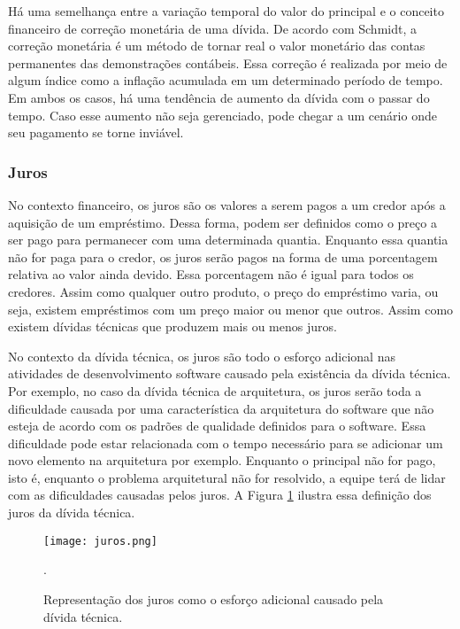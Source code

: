 Há uma semelhança entre a variação temporal do valor do principal e o conceito financeiro de correção monetária de uma dívida. De acordo com Schmidt\cite{santos2007teoria}, a correção monetária é um método de tornar real o valor monetário das contas permanentes das demonstrações contábeis. Essa correção é realizada por meio de algum índice como a inflação acumulada em um determinado período de tempo. Em ambos os casos, há uma tendência de aumento da dívida com o passar do tempo. Caso esse aumento não seja gerenciado, pode chegar a um cenário onde seu pagamento se torne inviável. 

\subsubsection{Juros} 

No contexto financeiro, os juros são os valores a serem pagos a um credor após a aquisição de um empréstimo. Dessa forma, podem ser definidos como o preço a ser pago para permanecer com uma determinada quantia. Enquanto essa quantia não for paga para o credor, os juros serão pagos na forma de uma porcentagem relativa ao valor ainda devido. Essa porcentagem não é igual para todos os credores. Assim como qualquer outro produto, o preço do empréstimo varia, ou seja, existem empréstimos com um preço maior ou menor que outros. Assim como existem dívidas técnicas que produzem mais ou menos juros.

No contexto da dívida técnica, os juros são todo o esforço adicional nas atividades de desenvolvimento software causado pela existência da dívida técnica. Por exemplo, no caso da dívida técnica de arquitetura, os juros serão toda a dificuldade causada por uma característica da arquitetura do software que não esteja de acordo com os padrões de qualidade definidos para o software. Essa dificuldade pode estar relacionada com o tempo necessário para se adicionar um novo elemento na arquitetura por exemplo. Enquanto o principal não for pago, isto é, enquanto o problema arquitetural não for resolvido, a equipe terá de lidar com as dificuldades causadas pelos juros. A Figura \ref{fig:juros} ilustra essa definição dos juros da dívida técnica. 

\begin{figure}[H]
  \centering
  \texttt{[image: juros.png]} 
  \caption{Representação dos juros como o esforço adicional causado pela dívida técnica. }.
  \label{fig:juros} 
\end{figure}



